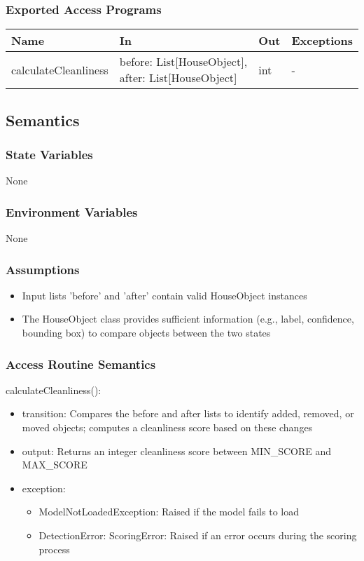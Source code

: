 \documentclass[12pt, titlepage]{article}
\begin{document}
\subsubsection{Exported Access Programs}

\begin{center}
\begin{tabular}{p{4cm} p{5cm} p{3cm} p{3.5cm}}
\hline
\textbf{Name} & \textbf{In} & \textbf{Out} & \textbf{Exceptions} \\
\hline
calculateCleanliness & before: List[HouseObject], after: List[HouseObject] & int & - \\
\hline
\end{tabular}
\end{center}

\subsection{Semantics}

\subsubsection{State Variables}
None

\subsubsection{Environment Variables}
None

\subsubsection{Assumptions}
\begin{itemize}
  \item Input lists 'before' and 'after' contain valid HouseObject instances
  \item The HouseObject class provides sufficient information (e.g., label, confidence, bounding box) to compare objects between the two states
\end{itemize}

\subsubsection{Access Routine Semantics}

\noindent calculateCleanliness():
\begin{itemize}
\item transition: Compares the before and after lists to identify added, removed, or moved objects; computes a cleanliness score based on these changes
\item output: Returns an integer cleanliness score between MIN{\_}SCORE and MAX{\_}SCORE
\item exception: 
\begin{itemize}
  \item ModelNotLoadedException: Raised if the model fails to load
  \item DetectionError: ScoringError: Raised if an error occurs during the scoring process
\end{itemize}

\end{itemize}
\end{document}
